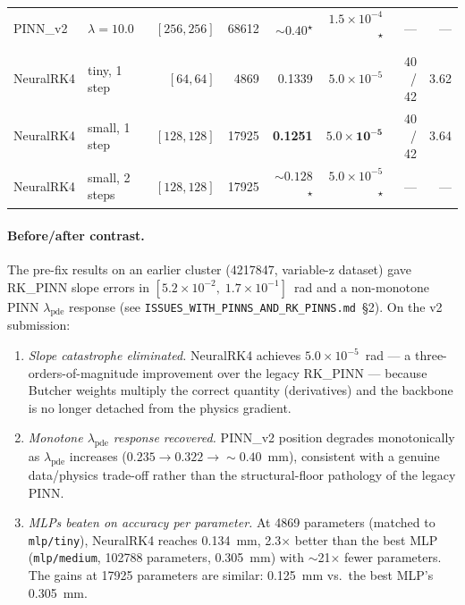 \documentclass[a4paper,11pt]{article}
\newcommand{\num}[1]{#1}
\newcommand{\dz}{\Delta z}
\begin{document}
\begin{table}[htbp]
\begin{tabular}{llrrrrrr}
PINN\_v2   & $\lambda = 10.0$ & $[256, 256]$ & \num{68612} & $\sim 0.40$\textsuperscript{$\star$} &
                $1.5 \times 10^{-4}$\textsuperscript{$\star$} & --- & --- \\
NeuralRK4 & tiny, 1 step  & $[64, 64]$    & \num{4869}  & 0.1339 & $5.0 \times 10^{-5}$  & 40 / 42 & 3.62 \\
NeuralRK4 & small, 1 step & $[128, 128]$  & \num{17925} & \textbf{0.1251} & $\mathbf{5.0 \times 10^{-5}}$ & 40 / 42 & 3.64 \\
NeuralRK4 & small, 2 steps & $[128, 128]$ & \num{17925} & $\sim 0.128$\textsuperscript{$\star$} &
                $5.0 \times 10^{-5}$\textsuperscript{$\star$} & --- & --- \\
\end{tabular}
\end{table}

\paragraph{Before/after contrast.}
The pre-fix results on an earlier cluster (4217847, variable-\dz{}
dataset) gave RK\_PINN slope errors in
$[5.2 \times 10^{-2},\; 1.7 \times 10^{-1}]$~rad and a non-monotone PINN
$\lambda_\text{pde}$ response (see
\texttt{ISSUES\_WITH\_PINNS\_AND\_RK\_PINNS.md}~\S2).  On the v2
submission:
\begin{enumerate}
  \item \emph{Slope catastrophe eliminated.} NeuralRK4 achieves
    $5.0 \times 10^{-5}$~rad --- a three-orders-of-magnitude improvement
    over the legacy RK\_PINN --- because Butcher weights multiply the
    correct quantity (derivatives) and the backbone is no longer detached
    from the physics gradient.
  \item \emph{Monotone $\lambda_\text{pde}$ response recovered.}
    PINN\_v2 position degrades monotonically as
    $\lambda_\text{pde}$ increases ($0.235 \to 0.322 \to \sim 0.40$~mm),
    consistent with a genuine data/physics trade-off rather than the
    structural-floor pathology of the legacy PINN.
  \item \emph{MLPs beaten on accuracy per parameter.}  At
    \num{4869} parameters (matched to \texttt{mlp/tiny}), NeuralRK4
    reaches 0.134~mm, 2.3$\times$ better than the best MLP
    (\texttt{mlp/medium}, \num{102788} parameters, 0.305~mm) with
    $\sim$21$\times$ fewer parameters.  The gains at \num{17925}
    parameters are similar: 0.125~mm vs.\ the best MLP's 0.305~mm.
\end{enumerate}
\end{document}
